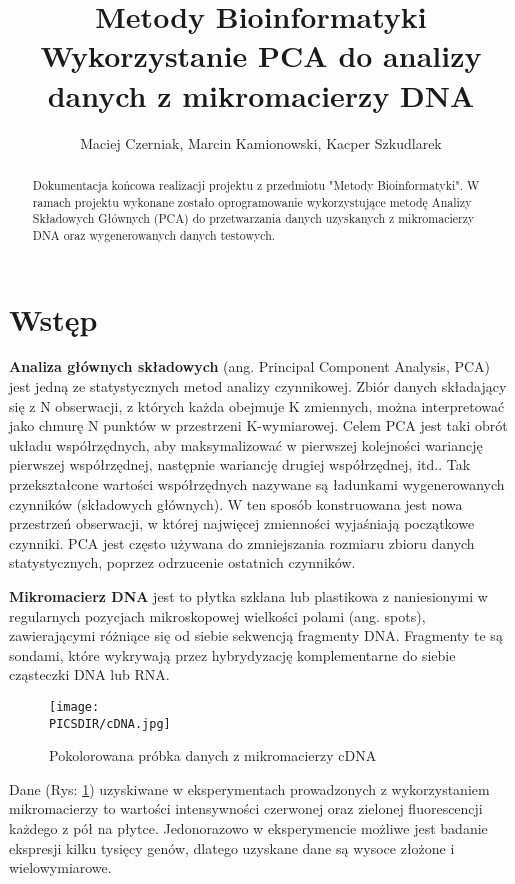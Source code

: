 \documentclass[a4paper,12pt]{article}
\def\PICSDIR{PICS}
\begin{document}
\title{{\small Metody Bioinformatyki}\\Wykorzystanie PCA do analizy danych z mikromacierzy DNA}
\author{Maciej Czerniak, Marcin Kamionowski, Kacper Szkudlarek}

\maketitle

\begin{abstract}
Dokumentacja końcowa realizacji projektu z przedmiotu "Metody Bioinformatyki". W ramach projektu wykonane zostało oprogramowanie wykorzystujące metodę Analizy Składowych Głównych (PCA) do przetwarzania danych uzyskanych z mikromacierzy DNA oraz wygenerowanych danych testowych.
\end{abstract}


\section{Wstęp}
\textbf{Analiza głównych składowych} (ang. Principal Component Analysis, PCA) jest jedną ze statystycznych metod analizy czynnikowej. Zbiór danych składający się z N obserwacji, z których każda obejmuje K zmiennych, można interpretować jako chmurę N punktów w przestrzeni K-wymiarowej. Celem PCA jest taki obrót układu współrzędnych, aby maksymalizować w pierwszej kolejności wariancję pierwszej współrzędnej, następnie wariancję drugiej współrzędnej, itd.. Tak przekształcone wartości współrzędnych nazywane są ładunkami wygenerowanych czynników (składowych głównych). W ten sposób konstruowana jest nowa przestrzeń obserwacji, w której najwięcej zmienności wyjaśniają początkowe czynniki. PCA jest często używana do zmniejszania rozmiaru zbioru danych statystycznych, poprzez odrzucenie ostatnich czynników.

\textbf{Mikromacierz DNA} jest to płytka szklana lub plastikowa z naniesionymi w regularnych pozycjach mikroskopowej wielkości polami (ang. spots), zawierającymi różniące się od siebie sekwencją fragmenty DNA. Fragmenty te są sondami, które wykrywają przez hybrydyzację komplementarne do siebie cząsteczki DNA lub RNA.

\begin{figure}
\centering
\texttt{[image: \\PICSDIR/cDNA.jpg]}
\caption{Pokolorowana próbka danych z mikromacierzy cDNA}
\label{rys:cDNA}
\end{figure}

Dane (Rys: \ref{rys:cDNA}) uzyskiwane w eksperymentach prowadzonych z wykorzystaniem mikromacierzy to wartości intensywności czerwonej oraz zielonej fluorescencji każdego z pół na płytce. Jedonorazowo w eksperymencie możliwe jest badanie ekspresji kilku tysięcy genów, dlatego uzyskane dane są wysoce złożone i wielowymiarowe.
\end{document}
